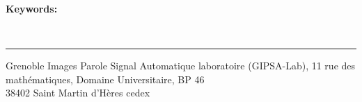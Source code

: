 \begin{vcenterpage}

{\large\textbf{Keywords:}}
    
\\
\noindent\rule[2pt]{\textwidth}{0.5pt}
\begin{center}
  Grenoble Images Parole Signal Automatique laboratoire (GIPSA-Lab), 11 rue des mathématiques, Domaine Universitaire, BP 46 \\
  38402 Saint Martin d'Hères cedex
\end{center}
\end{vcenterpage}

